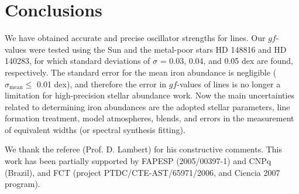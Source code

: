 \documentclass[traditabstract]{aa} %
\begin{document}
\section{Conclusions}

We have obtained accurate and precise oscillator strengths for  lines.
Our $gf$-values were tested using the Sun and the metal-poor stars HD 148816 and HD 140283, 
for which standard deviations of $\sigma$  = 0.03, 0.04, and 0.05 dex are found, respectively.
The standard error for the mean iron abundance is negligible ($\sigma_\mathrm{mean} \leq$ 0.01 dex),
and therefore the error in $gf$-values of  lines is no longer a limitation
for high-precision stellar abundance work. Now the main uncertainties related to
determining iron abundances are the adopted stellar parameters, line
formation treatment, model atmospheres, blends, and errors in the measurement of
equivalent widths (or spectral synthesis fitting).

\begin{acknowledgements}
We thank the referee (Prof. D. Lambert) for his constructive comments.
This work has been partially supported by FAPESP (2005/00397-1) and CNPq (Brazil), 
and FCT (project PTDC/CTE-AST/65971/2006, and Ciencia 2007 program).
\end{acknowledgements}
\end{document}
